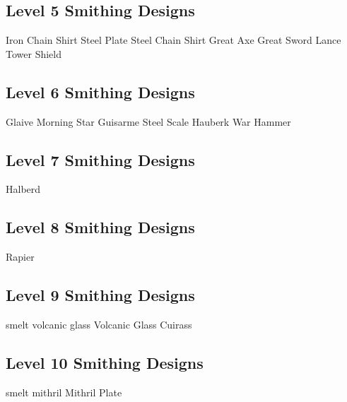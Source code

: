 \subsection{Level 5 Smithing Designs}
Iron Chain Shirt
Steel Plate
Steel Chain Shirt
Great Axe
Great Sword
Lance
Tower Shield


\subsection{Level 6 Smithing Designs}
Glaive
Morning Star
Guisarme
Steel Scale Hauberk
War Hammer


\subsection{Level 7 Smithing Designs}
Halberd


\subsection{Level 8 Smithing Designs}
Rapier


\subsection{Level 9 Smithing Designs}
smelt volcanic glass
Volcanic Glass Cuirass


\subsection{Level 10 Smithing Designs}

smelt mithril
Mithril Plate